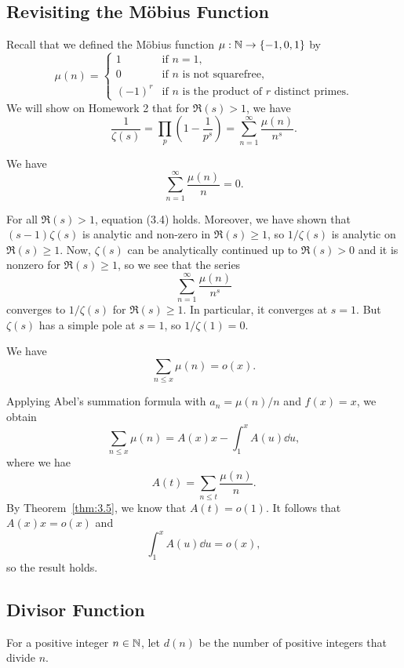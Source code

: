 \subsection{Revisiting the M\"obius Function}\label{subsec:3.3}
Recall that we defined the M\"obius function $\mu : \mathbb{N} \to \{-1, 0, 1\}$ by 
\[ \mu(n) = \begin{cases} 1 & \text{if } n = 1, \\ 0 & \text{if $n$ is not squarefree,} \\ (-1)^r & \text{if $n$ is the product of $r$ distinct primes.} \end{cases} \]
We will show on Homework 2 that for $\Re(s) > 1$, we have 
\[ \frac1{\zeta(s)} = \prod_p \left( 1 - \frac1{p^s} \right) = \sum_{n=1}^\infty \frac{\mu(n)}{n^s}. \]

\begin{thm}\label{thm:3.6}
We have 
\[ \sum_{n=1}^\infty \frac{\mu(n)}n = 0. \]
\end{thm}
\begin{pf}
For all $\Re(s) > 1$, equation (3.4) holds. Moreover, we have shown that $(s-1)\zeta(s)$ is analytic 
and non-zero in $\Re(s) \geq 1$, so $1/\zeta(s)$ is analytic on $\Re(s) \geq 1$. 
Now, $\zeta(s)$ can be analytically continued up to $\Re(s) > 0$ and it is nonzero for $\Re(s) \geq 1$,
so we see that the series 
\[ \sum_{n=1}^\infty \frac{\mu(n)}{n^s} \] 
converges to $1/\zeta(s)$ for $\Re(s) \geq 1$. In particular, it converges at $s = 1$. But 
$\zeta(s)$ has a simple pole at $s = 1$, so $1/\zeta(1) = 0$. 
\end{pf}

\begin{thm}\label{thm:3.7}
We have 
\[ \sum_{n\leq x} \mu(n) = o(x). \]
\end{thm}
\begin{pf}
Applying Abel's summation formula with $a_n = \mu(n) / n $ and $f(x) = x$, we obtain 
\[ \sum_{n\leq x} \mu(n) = A(x)x - \int_1^x A(u)\dd u, \]
where we hae 
\[ A(t) = \sum_{n\leq t} \frac{\mu(n)}n. \]
By Theorem~\ref{thm:3.5}, we know that $A(t) = o(1)$. It follows that $A(x) x = o(x)$ and 
\[ \int_1^x A(u)\dd u = o(x), \]
so the result holds. 
\end{pf}

\subsection{Divisor Function}\label{subsec:3.4}

\begin{defn}\label{def:3.8}
For a positive integer $n \in \mathbb{N}$, let $d(n)$ be the number of positive integers that 
divide $n$. 
\end{defn}

